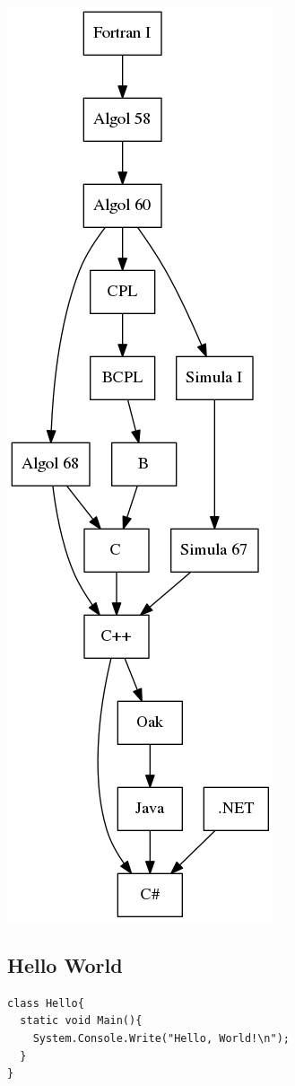 \documentclass[../Languages.tex]{subfiles}
\begin{document}
\begin{Figure}
  \centering
  \includegraphics[height=0.5\textheight]{csharp}
\end{Figure}

\subsection{Hello World}
\label{sub:hello_world}

\begin{verbatim}
class Hello{
  static void Main(){
    System.Console.Write("Hello, World!\n");
  }
}
\end{verbatim}


\newpage
\end{document}
